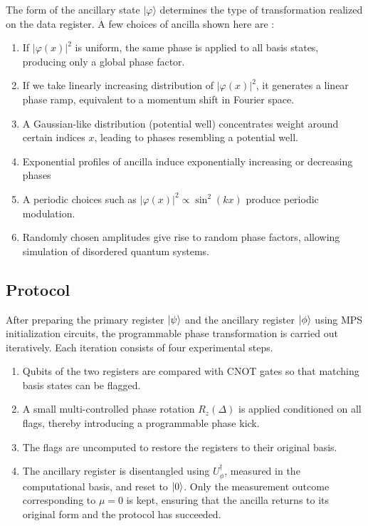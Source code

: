 \documentclass[12pt,a4paper]{article}
\begin{document}
The form of the ancillary state $|\varphi\rangle$ determines the type of transformation realized on the data register. A few choices of ancilla shown here are : 
\begin{enumerate}[label=\alph*)]
    \item If $|\varphi(x)|^2$ is uniform, the same phase is applied to all basis states, producing only a global phase factor.
    \item If we take linearly increasing distribution of $|\varphi(x)|^2$, it generates a linear phase ramp, equivalent to a momentum shift in Fourier space.
    \item A Gaussian-like distribution (potential well) concentrates weight around certain indices $x$, leading to phases resembling a potential well.
    \item Exponential profiles of ancilla induce exponentially increasing or decreasing phases
    \item A periodic choices such as $|\varphi(x)|^2 \propto \sin^2(kx)$ produce periodic modulation.
    \item Randomly chosen amplitudes give rise to random phase factors, allowing simulation of disordered quantum systems.
 \end{enumerate}
 
\subsection{Protocol}

After preparing the primary register $\ket{\psi}$ and the ancillary register $\ket{\phi}$ using MPS initialization circuits, the programmable phase transformation is carried out iteratively. Each iteration consists of four experimental steps. 
\begin{enumerate}[label=\roman*)]
    \item Qubits of the two registers are compared with CNOT gates so that matching basis states can be flagged. 
    \item A small multi-controlled phase rotation $R_{z}(\Delta)$ is applied conditioned on all flags, thereby introducing a programmable phase kick. 
    \item The flags are uncomputed to restore the registers to their original basis. 
    \item The ancillary register is disentangled using $U_{\phi}^{\dagger}$, measured in the computational basis, and reset to $\ket{0}$. Only the measurement outcome corresponding to $\mu = 0$ is kept, ensuring that the ancilla returns to its original form and the protocol has succeeded.
\end{enumerate}
\end{document}
